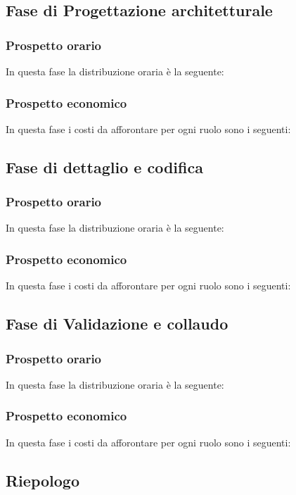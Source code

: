 \subsection{Fase di Progettazione architetturale}
    \subsubsection{Prospetto orario}
    In questa fase la distribuzione oraria è la seguente:
    \subsubsection{Prospetto economico}
    In questa fase i costi da afforontare per ogni ruolo sono i seguenti:
\subsection{Fase di dettaglio e codifica}
    \subsubsection{Prospetto orario}
    In questa fase la distribuzione oraria è la seguente:
    \subsubsection{Prospetto economico}
    In questa fase i costi da afforontare per ogni ruolo sono i seguenti:
\subsection{Fase di Validazione e collaudo}
    \subsubsection{Prospetto orario}
    In questa fase la distribuzione oraria è la seguente:
    \subsubsection{Prospetto economico}
    In questa fase i costi da afforontare per ogni ruolo sono i seguenti:
\subsection{Riepologo}
